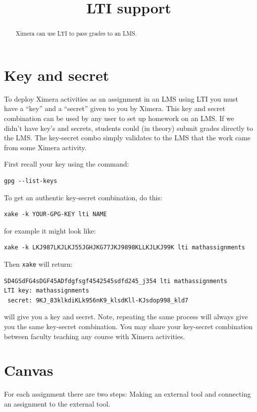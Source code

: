 \documentclass{ximera}
\title{LTI support}
\begin{document}
\begin{abstract}
Ximera can use LTI to pass grades to an LMS.
\end{abstract}
\maketitle

\section{Key and secret}

To deploy Ximera activities as an assignment in an LMS using LTI you
must have a ``key'' and a ``secret'' given to you by Ximera. This key
and secret combination can be used by any user to set up homework on
an LMS. If we didn't have key's and secrets, students could (in
theory) submit grades directly to the LMS. The key-secret combo simply
validates to the LMS that the work came from some Ximera activity.

First recall your key using the command:

\begin{verbatim}
gpg --list-keys
\end{verbatim}


To get an authentic key-secret combination, do this:

\begin{verbatim}
xake -k YOUR-GPG-KEY lti NAME
\end{verbatim}
for example it might look like:
\begin{verbatim}
xake -k LKJ987LKJLKJ55JGHJKG77JKJ9898KLLKJLKJ99K lti mathassignments
\end{verbatim}
Then \verb|xake| will return:
\begin{verbatim}
SD4GSdFG4sDGF45ADfdgfsgf4542545sdfd245_j354 lti mathassignments
LTI key: mathassignments
 secret: 9KJ_83klkdiKLk956nK9_klsdKll-KJsdop998_kld7        
\end{verbatim}

will give you a key and secret. Note, repeating the same process will
always give you the same key-secret combination. You may share your
key-secret combination between faculty teaching any course with Ximera
activities.

\section{Canvas}

For each assignment there are two steps: Making an external tool and connecting an assignment to the external tool.
\end{document}
